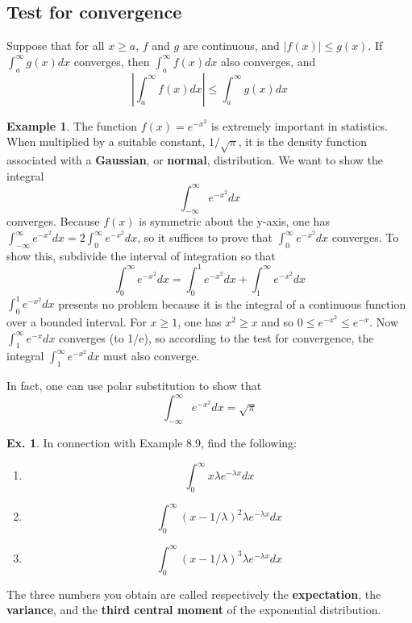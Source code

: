 \documentclass[10pt,a4paper]{book}
\theoremstyle{definition}\newtheorem{definition}{Definition}
\theoremstyle{definition}\newtheorem{fact}{Fact}
\theoremstyle{definition}\newtheorem{ex}{Ex.}
\theoremstyle{definition}\newtheorem{project}{Project}
\theoremstyle{definition}\newtheorem{problem}{Problem}
\theoremstyle{definition}\newtheorem{example}{Example}
\numberwithin{theorem}{chapter}
\numberwithin{corollary}{chapter}
\numberwithin{assumption}{chapter}
\numberwithin{definition}{chapter}
\numberwithin{prop}{chapter}
\numberwithin{notation}{chapter}
\numberwithin{problem}{chapter}
\numberwithin{example}{chapter}
\numberwithin{fact}{chapter}
\numberwithin{ex}{chapter}
\begin{document}
	\subsection{Test for convergence}
	
	Suppose that for all $x \geq a$, $f$ and $g$ are continuous, and $|f (x)| \leq g(x)$. If $\int_a^{\infty} g(x)dx$ converges, then $\int_a^{\infty} f (x) dx$ also converges, and
	$$\left| \int_a^{\infty}f(x) dx \right| \leq \int_a^{\infty} g(x) dx$$
	
	\begin{example}
		The function $f(x) = e^{-x^2}$ is extremely important in statistics. When multiplied by a suitable constant, $1/\sqrt{\pi}$, it is the density function associated with a \textbf{Gaussian}, or \textbf{normal}, distribution. We want to show the integral
		$$\int_{-\infty}^{\infty} e^{-x^2} dx$$
		converges. Because $f(x)$ is symmetric about the y-axis, one has $\int_{-\infty}^{\infty} e^{-x^2} dx = 2\int_0^{\infty} e^{-x^2}dx$, so it suffices to prove that $\int_0^{\infty} e^{-x^2}dx$ converges. To show this, subdivide the interval of integration so that
		$$\int_0^{\infty} e^{-x^2}dx = \int_0^1 e^{-x^2}dx + \int_1^{\infty} e^{-x^2}dx$$
		$\int_0^1 e^{-x^2} dx$ presents no problem because it is the integral of a continuous function over a bounded interval. For $x \geq 1$, one has $x^2 \geq x$ and so $0 \leq e^{-x^2} \leq e^{-x}$. Now $\int_1^{\infty} e^{-x} dx$ converges (to 1/e), so according to the test for convergence, the integral $\int_1^{\infty} e^{-x^2} dx$ must also converge.
		
		In fact, one can use polar substitution to show that
		$$\int_{-\infty}^{\infty} e^{-x^2} dx = \sqrt{\pi}$$
	\end{example}
	
	\begin{ex}
		In connection with Example 8.9, find the following:
		\begin{enumerate}[label=(\alph*)]
			\item $$\int_0^{\infty} x\lambda e^{-\lambda x}dx$$
			\item $$\int_0^{\infty} (x-1/\lambda)^2 \lambda e^{-\lambda x} dx$$
			\item $$\int_0^{\infty} (x-1/\lambda)^3 \lambda e^{-\lambda x} dx$$
		\end{enumerate}
		The three numbers you obtain are called respectively the \textbf{expectation}, the \textbf{variance}, and the \textbf{third central moment} of the exponential distribution.
	\end{ex}
	
\end{document}
